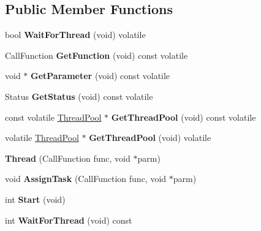 \subsection*{Public Member Functions}
\begin{DoxyCompactItemize}
\item 
\hypertarget{structThread_afe5d05dac33d85530c7227592e85f2a5}{}bool {\bfseries Wait\+For\+Thread} (void) volatile\label{structThread_afe5d05dac33d85530c7227592e85f2a5}

\item 
\hypertarget{structThread_a566a2f7d6c00545f798a07128e32b781}{}Call\+Function {\bfseries Get\+Function} (void) const  volatile\label{structThread_a566a2f7d6c00545f798a07128e32b781}

\item 
\hypertarget{structThread_aa7e8fe968e580f70d9f72718e62913f9}{}void $\ast$ {\bfseries Get\+Parameter} (void) const  volatile\label{structThread_aa7e8fe968e580f70d9f72718e62913f9}

\item 
\hypertarget{structThread_a1eafba8f9ae6fdd94beee19edcf46e63}{}Status {\bfseries Get\+Status} (void) const  volatile\label{structThread_a1eafba8f9ae6fdd94beee19edcf46e63}

\item 
\hypertarget{structThread_af54b14ab505a11f515098acc20f5a2c6}{}const volatile \hyperlink{classThreadPool}{Thread\+Pool} $\ast$ {\bfseries Get\+Thread\+Pool} (void) const  volatile\label{structThread_af54b14ab505a11f515098acc20f5a2c6}

\item 
\hypertarget{structThread_ac32b85da1c59215ce291fdfdfa7481fe}{}volatile \hyperlink{classThreadPool}{Thread\+Pool} $\ast$ {\bfseries Get\+Thread\+Pool} (void) volatile\label{structThread_ac32b85da1c59215ce291fdfdfa7481fe}

\item 
\hypertarget{structThread_a1e50fa37e9eeda392bd9dc1c289d4a38}{}{\bfseries Thread} (Call\+Function func, void $\ast$parm)\label{structThread_a1e50fa37e9eeda392bd9dc1c289d4a38}

\item 
\hypertarget{structThread_a2fd01e8ca79c06a4505a6c4265bb1b3d}{}void {\bfseries Assign\+Task} (Call\+Function func, void $\ast$parm)\label{structThread_a2fd01e8ca79c06a4505a6c4265bb1b3d}

\item 
\hypertarget{structThread_a015734e2c5e94d78f27e485761a0912d}{}int {\bfseries Start} (void)\label{structThread_a015734e2c5e94d78f27e485761a0912d}

\item 
\hypertarget{structThread_a30fd271ad59d139fbb27f9c6ed42ff3a}{}int {\bfseries Wait\+For\+Thread} (void) const \label{structThread_a30fd271ad59d139fbb27f9c6ed42ff3a}

\end{DoxyCompactItemize}

